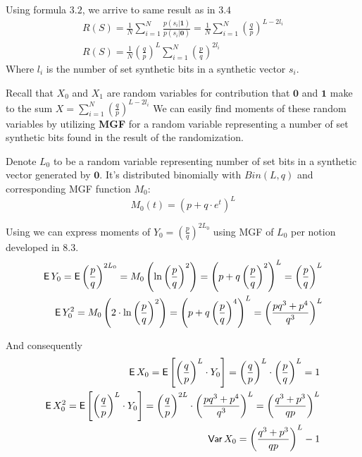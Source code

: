 \documentclass[11pt]{article}
\newcommand{\zv}{\textbf{0}}
\newcommand{\uv}{\textbf{1}}
\begin{document}
Using formula $3.2$, we arrive to same result as in $3.4$
\begin{align}
R(S) = \frac{1}{N} \sum_{i=1}^N \frac{p(s_i | \uv)} {p(s_i|\zv)} = \frac{1}{N}  \sum_{i=1}^N \left ( \frac{q} {p} \right )^{L - 2l_i}  \\
R(S) = \frac{1}{N}  \left ( \frac{q} {p} \right )^{L}  \sum_{i=1}^N \left ( \frac{p} {q} \right )^{2l_i}
\end{align}
Where $l_i$ is the number of set synthetic bits in a synthetic vector $s_i$.

Recall that $X_0$ and $X_1$ are random variables for contribution that $\zv$ and $\uv$ make to the sum $X =  \sum_{i=1}^N \left ( \frac{q} {p} \right )^{L - 2l_i} $
We can easily find moments of these random variables by utilizing \textbf{MGF} for a random variable representing a number of set synthetic bits found in  the result of the randomization.

Denote $L_0$ to be a random variable representing number of set bits in a synthetic vector generated by $\zv$. It's distributed binomially with $Bin(L,q)$ and corresponding MGF function $M_0$:
\[ M_0(t) = (p + q \cdot e^t)^L \]

Using we can express moments of $Y_0 = \left ( \frac{p} {q} \right )^{2L_0}$ using MGF of $L_0$ per notion developed in $8.3$.
\begin{align}
 \operatorname{\mathsf{E}} Y_0 = \operatorname{\mathsf{E}} \left ( \frac{p} {q} \right )^{2L_0} = M_0 \left (\ln{ \left ( \frac{p} {q} \right )^2} \right) = \left (p + q \left ( \frac{p} {q} \right )^2 \right )^L =  \left ( \frac{p} {q} \right )^L \\
 \operatorname{\mathsf{E}} Y_0^2 = M_0 \left (2 \cdot \ln{ \left ( \frac{p} {q} \right )^2} \right) = \left (p + q \left ( \frac{p} {q} \right )^4 \right )^L =  \left ( \frac{pq^3 + p^4} {q^3} \right )^L
\end{align}

And consequently
\begin{align}
 \operatorname{\mathsf{E}} X_0 =  \operatorname{\mathsf{E}} \left [  \left ( \frac{q} {p} \right )^{L}  \cdot Y_0  \right ]  =  \left ( \frac{q} {p} \right )^{L}   \cdot \left ( \frac{p} {q} \right )^L = 1 \\
 \operatorname{\mathsf{E}} X_0^2 = \operatorname{\mathsf{E}} \left [  \left ( \frac{q} {p} \right )^{L}  \cdot Y_0   \right ]  =  \left ( \frac{q} {p} \right )^{2L}  \cdot  \left ( \frac{pq^3 + p^4} {q^3} \right )^L =  \left ( \frac{q^3 + p^3} {qp} \right )^L \\
 \operatorname{\mathsf{Var}} X_0 =   \left ( \frac{q^3 + p^3} {qp} \right )^L  - 1
 \end{align}
\end{document}
